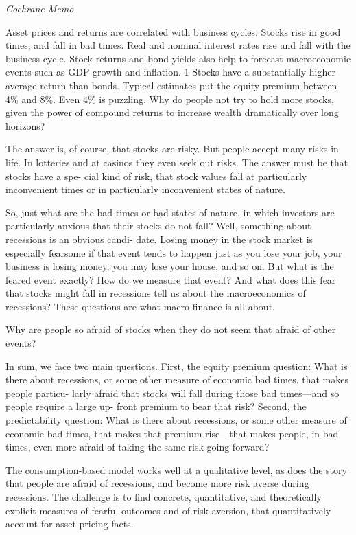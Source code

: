 \documentclass[
]{book}
\begin{document}
\emph{Cochrane Memo}

Asset prices and returns are correlated with business cycles. Stocks rise in good times,
and fall in bad times. Real and nominal interest rates rise and fall with the business cycle.
Stock returns and bond yields also help to forecast macroeconomic events such as GDP
growth and inflation. 1
Stocks have a substantially higher average return than bonds. Typical estimates put the equity
premium between 4\% and 8\%. Even 4\% is puzzling. Why do people not try to hold more stocks,
given the power of compound returns to increase wealth dramatically over long horizons?

The answer is, of course, that stocks are risky. But people accept many risks in life. In
lotteries and at casinos they even seek out risks. The answer must be that stocks have a spe-
cial kind of risk, that stock values fall at particularly inconvenient times or in particularly
inconvenient states of nature.

So, just what are the bad times or bad states of nature, in which investors are particularly
anxious that their stocks do not fall? Well, something about recessions is an obvious candi-
date. Losing money in the stock market is especially fearsome if that event tends to happen
just as you lose your job, your business is losing money, you may lose your house, and so on.
But what is the feared event exactly? How do we measure that event? And what does
this fear that stocks might fall in recessions tell us about the macroeconomics of recessions?
These questions are what macro-finance is all about.

Why are people so afraid of stocks when they do not seem that afraid
of other events?

In sum, we face two main questions. First, the equity premium question: What is there
about recessions, or some other measure of economic bad times, that makes people particu-
larly afraid that stocks will fall during those bad times---and so people require a large up-
front premium to bear that risk? Second, the predictability question: What is there
about recessions, or some other measure of economic bad times, that makes that premium
rise---that makes people, in bad times, even more afraid of taking the same risk going
forward?

The
consumption-based model works well at a qualitative level, as does the story that people
are afraid of recessions, and become more risk averse during recessions. The challenge is to
find concrete, quantitative, and theoretically explicit measures of fearful outcomes and of
risk aversion, that quantitatively account for asset pricing facts.
\end{document}
